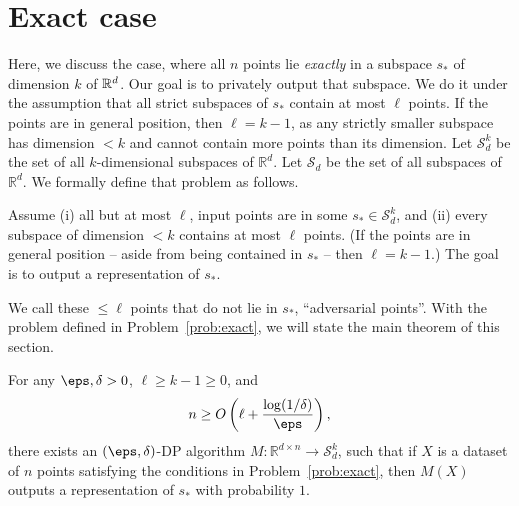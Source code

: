 \section{Exact case}

Here, we discuss the case, where all $n$ points lie \emph{exactly} in a subspace $s_*$ of dimension $k$ of $\mathbb{R}^d$. Our goal
is to privately output that subspace. We do it under the
assumption that all strict subspaces of $s_*$ contain at most $\ell$
points.
If the points are in general position, then $\ell=k-1$, as any strictly smaller subspace has dimension $<k$ and cannot contain more points than its dimension.
Let $\mathcal{S}_d^k$ be the set of all $k$-dimensional
subspaces of $\mathbb{R}^d$. Let $\mathcal{S}_d$ be the
set of all subspaces of $\mathbb{R}^d$. We formally define
that problem as follows.

\begin{problem}\label{prob:exact}
    Assume (i) all but at most $\ell$, input points are in some
    $s_* \in \mathcal{S}_d^k$, and (ii)  every subspace
    of dimension $<k$ contains at most $\ell$ points. (If the points
    are in general position -- aside from being contained in
    $s_*$ -- then $\ell=k-1$.) The goal is to output a representation
    of $s_*$.
\end{problem}

We call these $\leq \ell$ points that do not lie in
$s_*$, ``adversarial points''.
With the problem defined in Problem~\ref{prob:exact}, we
will state the main theorem of this section.

\begin{theorem}\label{thm:exact}
    For any $\eps,\delta>0$, $\ell \ge k-1 \ge 0$, and
    $$n \geq O\left(\ell + \frac{\log(1/\delta)}{\eps}\right),$$ there
    exists an $(\eps,\delta)$-DP algorithm
    $M : \mathbb{R}^{d \times n} \to \mathcal{S}_d^k$, such that if
    $X$ is a dataset of $n$ points satisfying the conditions
    in Problem~\ref{prob:exact},
    then $M(X)$ outputs a representation of $s_*$ with probability $1$.
\end{theorem}

